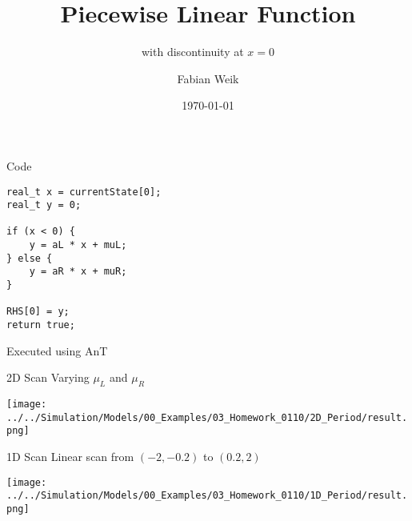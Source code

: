 \documentclass{beamer}
\title{Piecewise Linear Function}
\subtitle{with discontinuity at $x = 0$}
\author{Fabian Weik}
\institute{Overleaf}
\date{\today}
\begin{document}
\frame{\titlepage}

\begin{frame}[fragile]{Code}
    \begin{lstlisting}
real_t x = currentState[0];
real_t y = 0;

if (x < 0) {
    y = aL * x + muL;
} else {
    y = aR * x + muR;
}

RHS[0] = y;
return true;
    \end{lstlisting}
    
    Executed using AnT
    
\end{frame}

\begin{frame}{2D Scan}
    Varying $\mu_L$ and $\mu_R$
    
    \centering
    \vspace*{1em}
    \texttt{[image: ../../Simulation/Models/00\_Examples/03\_Homework\_0110/2D\_Period/result.png]}
\end{frame}

\begin{frame}{1D Scan}
    Linear scan from $(-2, -0.2)$ to $(0.2, 2)$

    \centering
    \vspace*{1em}
    \texttt{[image: ../../Simulation/Models/00\_Examples/03\_Homework\_0110/1D\_Period/result.png]}
\end{frame}
\end{document}
